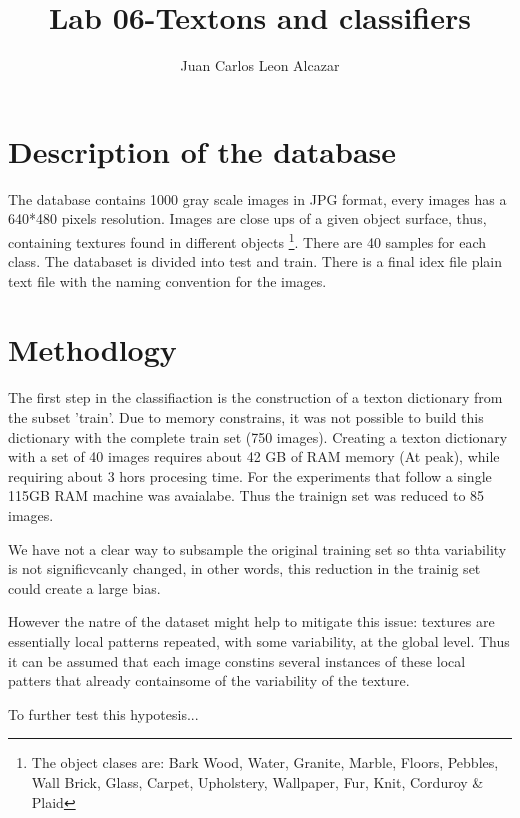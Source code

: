 \documentclass[a4paper]{article}
\title{Lab 06-Textons and classifiers}
\author{Juan Carlos Leon Alcazar}
\begin{document}
\maketitle

\section{Description of the database}

The database\cite{Lazebnik2005} contains 1000 gray scale images in JPG format, every images has a 640*480 pixels resolution. Images are close ups of a given object surface, thus, containing textures found in different objects \footnote{The object clases are: Bark Wood, Water, Granite, Marble, Floors, Pebbles, Wall Brick, Glass, Carpet, Upholstery, Wallpaper, Fur, Knit, Corduroy \& Plaid }. There are 40 samples for each class. The databaset is divided into test and train. There is a final idex file plain text file with the naming convention for the images.



\section{Methodlogy}

The first step in the classifiaction is the construction of a texton dictionary from the subset 'train'.  Due to memory constrains, it was not possible to build this dictionary with the complete train set (750 images). Creating a texton dictionary with a set of 40 images requires about 42 GB of RAM memory (At peak), while requiring about 3 hors procesing time. For the experiments that follow  a single 115GB RAM machine was avaialabe. Thus the trainign set was reduced to 85 images. 

We have not a clear way to subsample the original training set so thta variability is not significvcanly changed, in other words, this reduction in the trainig set could create a large bias.

However the natre of the dataset might help to mitigate this issue: textures are essentially local patterns repeated, with some variability, at the global level. Thus it can be assumed that each image constins several instances of these local patters that already containsome of the variability of the texture.

To further test this hypotesis...  
\end{document}
